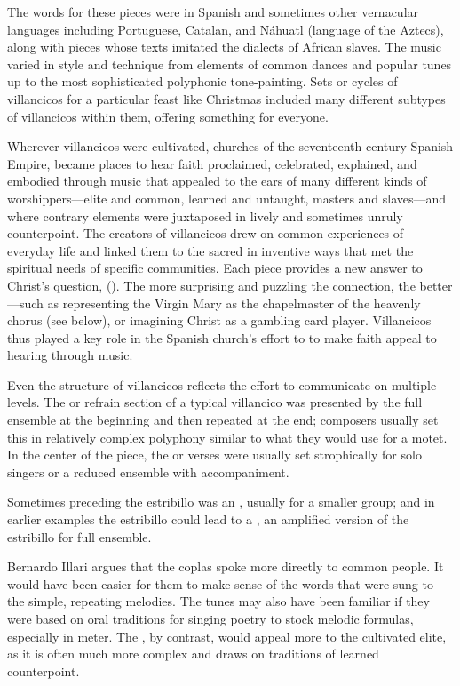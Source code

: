 The words for these pieces were in Spanish and sometimes other vernacular
languages including Portuguese, Catalan, and Náhuatl (language of the Aztecs),
along with pieces whose texts imitated the dialects of African slaves.
The music varied in style and technique from elements of common dances
and popular tunes up to the most sophisticated polyphonic tone-painting.
Sets or cycles of villancicos for a particular feast like Christmas included
many different subtypes of villancicos within them, offering something for
everyone.

Wherever villancicos were cultivated, churches of the seventeenth-century
Spanish Empire, became places to hear faith proclaimed, celebrated, explained,
and embodied through music that appealed to the ears of many different kinds of
worshippers---elite and common, learned and untaught, masters and slaves---and
where contrary elements were juxtaposed in lively and sometimes unruly
counterpoint.
The creators of villancicos drew on common experiences of everyday life and
linked them to the sacred in inventive ways that met the spiritual needs of
specific communities.
Each piece provides a new answer to Christ's question, 
().
The more surprising and puzzling the connection, the better---such as
representing the Virgin Mary as the chapelmaster of the heavenly chorus (see
below), or imagining Christ as a gambling card player.%
    \Autocite{Cashner:PlayingCards}
Villancicos thus played a key role in the Spanish church's effort to to make
faith appeal to hearing through music.

Even the structure of villancicos reflects the effort to communicate on
multiple levels.
The  or refrain section of a typical villancico was presented
by the full ensemble at the beginning and then repeated at the end; composers
usually set this in relatively complex polyphony similar to what they would use
for a motet.
In the center of the piece, the  or verses were usually set
strophically for solo singers or a reduced ensemble with accompaniment.%
\begin{Footnote}
    Sometimes preceding the estribillo was an , usually for
    a smaller group; and in earlier examples the estribillo could lead to a
    , an amplified version of the estribillo for full
    ensemble.
\end{Footnote}
Bernardo Illari argues that the coplas spoke more directly to common people.%
    \Autocite{Illari:Polychoral}
It would have been easier for them to make sense of the words that were sung to
the simple, repeating melodies.
The tunes may also have been familiar if they were based on oral traditions for
singing poetry to stock melodic formulas, especially in  meter.
The , by contrast, would appeal more to the cultivated elite,
as it is often much more complex and draws on traditions of learned
counterpoint.

